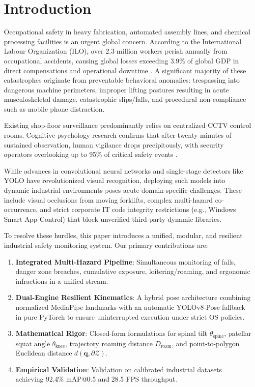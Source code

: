 \documentclass[conference]{IEEEtran}
\begin{document}
\section{Introduction}
Occupational safety in heavy fabrication, automated assembly lines, and chemical processing facilities is an urgent global concern. According to the International Labour Organization (ILO), over 2.3 million workers perish annually from occupational accidents, causing global losses exceeding 3.9\% of global GDP in direct compensations and operational downtime \cite{ilo2023}. A significant majority of these catastrophes originate from preventable behavioral anomalies: trespassing into dangerous machine perimeters, improper lifting postures resulting in acute musculoskeletal damage, catastrophic slips/falls, and procedural non-compliance such as mobile phone distraction.

Existing shop-floor surveillance predominantly relies on centralized CCTV control rooms. Cognitive psychology research confirms that after twenty minutes of sustained observation, human vigilance drops precipitously, with security operators overlooking up to 95\% of critical safety events \cite{warm2008}.

While advances in convolutional neural networks and single-stage detectors like YOLO \cite{yolov8} have revolutionized visual recognition, deploying such models into dynamic industrial environments poses acute domain-specific challenges. These include visual occlusions from moving forklifts, complex multi-hazard co-occurrence, and strict corporate IT code integrity restrictions (e.g., Windows Smart App Control) that block unverified third-party dynamic libraries.

To resolve these hurdles, this paper introduces a unified, modular, and resilient industrial safety monitoring system. Our primary contributions are:
\begin{enumerate}
    \item \textbf{Integrated Multi-Hazard Pipeline}: Simultaneous monitoring of falls, danger zone breaches, cumulative exposure, loitering/roaming, and ergonomic infractions in a unified stream.
    \item \textbf{Dual-Engine Resilient Kinematics}: A hybrid pose architecture combining normalized MediaPipe landmarks with an automatic YOLOv8-Pose fallback in pure PyTorch to ensure uninterrupted execution under strict OS policies.
    \item \textbf{Mathematical Rigor}: Closed-form formulations for spinal tilt $\theta_{\text{spine}}$, patellar squat angle $\theta_{\text{knee}}$, trajectory roaming distance $D_{\text{roam}}$, and point-to-polygon Euclidean distance $d(\mathbf{q}, \partial \mathcal{Z})$.
    \item \textbf{Empirical Validation}: Validation on calibrated industrial datasets achieving 92.4\% mAP@0.5 and 28.5 FPS throughput.
\end{enumerate}
\end{document}
